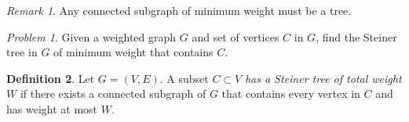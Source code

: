 \documentclass[10pt,letterpaper,cm]{nupset}
\theoremstyle{definition}
\newtheorem{definition}{Definition}[subsection]
\theoremstyle{theorem}
\theoremstyle{remark}
\newtheorem{remark}[definition]{Remark}
\newtheorem*{prob}{Problem}
\newcommand{\1}{\mathbf{1}}
\newcommand{\0}{\vec 0}
\begin{document}
\begin{remark}
Any connected subgraph of minimum weight must be a tree.
\end{remark}

\medskip

\begin{prob}
Given a weighted graph $G$ and set of vertices $C$ in $G$, find the Steiner tree in $G$ of minimum weight that contains $C$.
\end{prob}

\begin{definition}
Let $G= \left(V, E\right)$. A subset $C\subset V$ \textit{has a Steiner tree of total weight $W$} if there exists a connected subgraph of $G$ that contains every vertex in $C$ and has weight at most $W$.
\end{definition}
\end{document}
